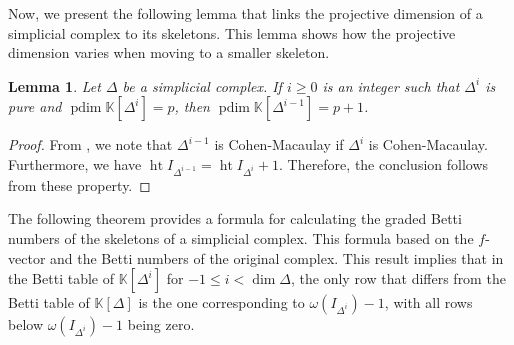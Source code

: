 \documentclass[a4paper,12pt]{amsart}
\numberwithin{equation}{section}
\newtheorem{lemma}[theorem]{Lemma}
\newtheorem{corollary}[theorem]{Corollary}
\theoremstyle{definition}
\newcommand{\K}[0]{\mathbb{K}}
\DeclareMathOperator{\reg}{reg}
\DeclareMathOperator{\pdim}{pdim}
\DeclareMathOperator{\hte}{ht}
\begin{document}


Now, we present the following lemma that links the projective dimension of a simplicial complex to its skeletons. This lemma shows how the projective dimension varies when moving to a smaller skeleton.
\begin{lemma}\label{pdim}
	Let $\Delta$ be a simplicial complex. If $i\ge0$ is an integer such that $\Delta^{i}$ is pure and $\pdim\K[\Delta^i]=p$, then $\pdim\K[\Delta^{i-1}]=p+1$.
\end{lemma}
\begin{proof}
	From \cite{AhmedFrobergNamiq2023}, we note that $\Delta^{i-1}$ is Cohen-Macaulay if $\Delta^i$ is Cohen-Macaulay. Furthermore, we have $\hte I_{\Delta^{i-1}}=\hte I_{\Delta^i}+1$. Therefore, the conclusion follows from these property.
\end{proof}

The following theorem provides a formula for calculating the graded Betti numbers of the skeletons of a simplicial complex. This formula based on the $f$-vector and the Betti numbers of the original complex. This result implies that in the Betti table of $\K[\Delta^i]$ for $-1 \leq i<\dim\Delta$, the only row that differs from the Betti table of $\K[\Delta]$ is the one corresponding to $\omega(I_{\Delta^i})-1$, with all rows below $\omega(I_{\Delta^i})-1$ being zero.
\end{document}
